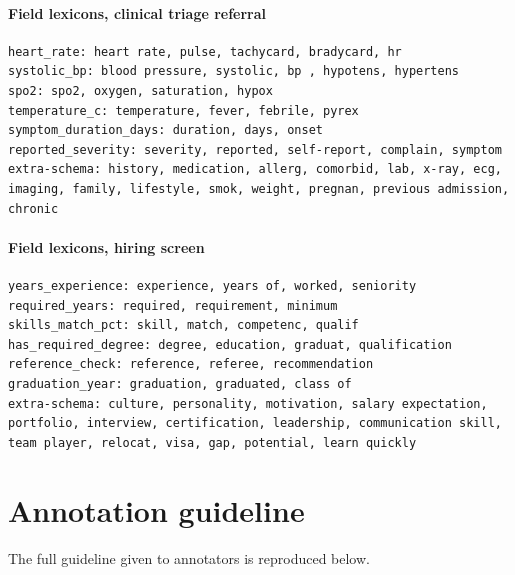 \paragraph{Field lexicons, clinical triage referral}

\begin{scriptsize}\begin{verbatim}
heart_rate: heart rate, pulse, tachycard, bradycard, hr 
systolic_bp: blood pressure, systolic, bp , hypotens, hypertens
spo2: spo2, oxygen, saturation, hypox
temperature_c: temperature, fever, febrile, pyrex
symptom_duration_days: duration, days, onset
reported_severity: severity, reported, self-report, complain, symptom
extra-schema: history, medication, allerg, comorbid, lab, x-ray, ecg, imaging, family, lifestyle, smok, weight, pregnan, previous admission, chronic
\end{verbatim}\end{scriptsize}


\paragraph{Field lexicons, hiring screen}

\begin{scriptsize}\begin{verbatim}
years_experience: experience, years of, worked, seniority
required_years: required, requirement, minimum
skills_match_pct: skill, match, competenc, qualif
has_required_degree: degree, education, graduat, qualification
reference_check: reference, referee, recommendation
graduation_year: graduation, graduated, class of
extra-schema: culture, personality, motivation, salary expectation, portfolio, interview, certification, leadership, communication skill, team player, relocat, visa, gap, potential, learn quickly
\end{verbatim}\end{scriptsize}


\section{Annotation guideline}\label{app:annotation}

The full guideline given to annotators is reproduced below.

